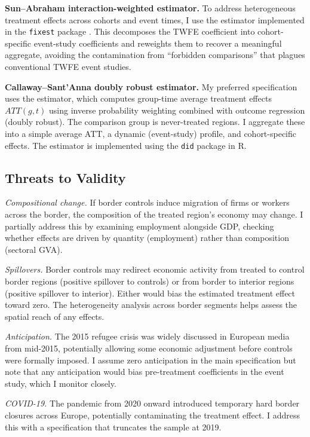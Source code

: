 \documentclass[12pt]{article}
\begin{document}
\textbf{Sun--Abraham interaction-weighted estimator.} To address heterogeneous treatment effects across cohorts and event times, I use the \cite{SunA2021} estimator implemented in the \texttt{fixest} package \citep{Berge2018}. This decomposes the TWFE coefficient into cohort-specific event-study coefficients and reweights them to recover a meaningful aggregate, avoiding the contamination from ``forbidden comparisons'' that plagues conventional TWFE event studies.

\textbf{Callaway--Sant'Anna doubly robust estimator.} My preferred specification uses the \cite{CallawayS2021} estimator, which computes group-time average treatment effects $ATT(g,t)$ using inverse probability weighting combined with outcome regression (doubly robust). The comparison group is never-treated regions. I aggregate these into a simple average ATT, a dynamic (event-study) profile, and cohort-specific effects. The estimator is implemented using the \texttt{did} package in R.

\subsection{Threats to Validity}

\textit{Compositional change.} If border controls induce migration of firms or workers across the border, the composition of the treated region's economy may change. I partially address this by examining employment alongside GDP, checking whether effects are driven by quantity (employment) rather than composition (sectoral GVA).

\textit{Spillovers.} Border controls may redirect economic activity from treated to control border regions (positive spillover to controls) or from border to interior regions (positive spillover to interior). Either would bias the estimated treatment effect toward zero. The heterogeneity analysis across border segments helps assess the spatial reach of any effects.

\textit{Anticipation.} The 2015 refugee crisis was widely discussed in European media from mid-2015, potentially allowing some economic adjustment before controls were formally imposed. I assume zero anticipation in the main specification but note that any anticipation would bias pre-treatment coefficients in the event study, which I monitor closely.

\textit{COVID-19.} The pandemic from 2020 onward introduced temporary hard border closures across Europe, potentially contaminating the treatment effect. I address this with a specification that truncates the sample at 2019.
\end{document}
